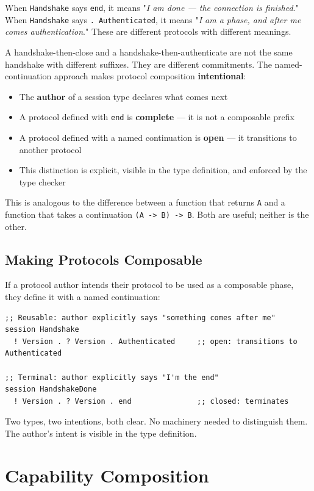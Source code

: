 \documentclass[11pt]{article}
\begin{document}
When \texttt{Handshake} says \texttt{end}, it means "\emph{I am done --- the connection is
finished}." When \texttt{Handshake} says \texttt{. Authenticated}, it means "\emph{I am a phase,
and after me comes authentication}." These are different protocols with
different meanings.

A handshake-then-close and a handshake-then-authenticate are not the same
handshake with different suffixes. They are different commitments. The
named-continuation approach makes protocol composition \textbf{intentional}:

\begin{itemize}
\item The \textbf{author} of a session type declares what comes next
\item A protocol defined with \texttt{end} is \textbf{complete} --- it is not a composable prefix
\item A protocol defined with a named continuation is \textbf{open} --- it transitions
to another protocol
\item This distinction is explicit, visible in the type definition, and
enforced by the type checker
\end{itemize}

This is analogous to the difference between a function that returns \texttt{A} and a
function that takes a continuation \texttt{(A -> B) -> B}. Both are useful; neither
is the other.
\subsection{Making Protocols Composable}
\label{sec:orgfc697e3}

If a protocol author intends their protocol to be used as a composable phase,
they define it with a named continuation:

\begin{verbatim}
;; Reusable: author explicitly says "something comes after me"
session Handshake
  ! Version . ? Version . Authenticated     ;; open: transitions to Authenticated

;; Terminal: author explicitly says "I'm the end"
session HandshakeDone
  ! Version . ? Version . end               ;; closed: terminates
\end{verbatim}

Two types, two intentions, both clear. No machinery needed to distinguish them.
The author's intent is visible in the type definition.
\section{Capability Composition}
\label{sec:org8a0e235}
\end{document}
